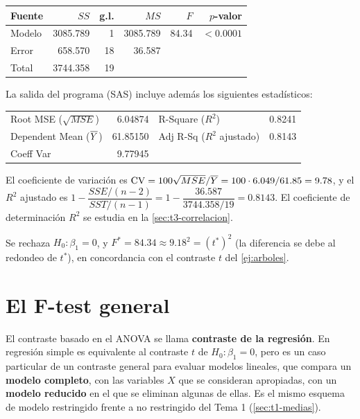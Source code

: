 \begin{ejemplo}
  \begin{center}
    \renewcommand{\arraystretch}{1.2}
    \begin{tabular}{lrrrrr}
      \toprule
      Fuente & $SS$ & g.l. & $MS$ & $F$ & $p$-valor \\
      \midrule
      Modelo & 3085.789 & 1 & 3085.789 & 84.34 & $<0.0001$ \\
      Error & 658.570 & 18 & 36.587 & & \\
      Total & 3744.358 & 19 & & & \\
      \bottomrule
    \end{tabular}
  \end{center}
  La salida del programa (SAS) incluye además los siguientes estadísticos:
  \begin{center}
    \renewcommand{\arraystretch}{1.2}
    \begin{tabular}{lr@{\qquad}lr}
      \toprule
      Root MSE ($\sqrt{MSE}$) & 6.04874 & R-Square ($R^2$) & 0.8241 \\
      Dependent Mean ($\overline{Y}$) & 61.85150 & Adj R-Sq ($R^2$ ajustado) & 0.8143 \\
      Coeff Var & 9.77945 & & \\
      \bottomrule
    \end{tabular}
  \end{center}
  El coeficiente de variación es $\text{CV}=100\sqrt{MSE}/\overline{Y}=100\cdot6.049/61.85=9.78$,
  y el $R^2$ ajustado es $1-\dfrac{SSE/(n-2)}{SST/(n-1)}=1-\dfrac{36.587}{3744.358/19}=0.8143$.
  El coeficiente de determinación $R^2$ se estudia en la \cref{sec:t3-correlacion}.

  Se rechaza $H_0\colon\beta_1=0$, y $F^*=84.34\approx9.18^2=(t^*)^2$ (la diferencia se debe al
  redondeo de $t^*$), en concordancia con el
  contraste $t$ del \cref{ej:arboles}.
\end{ejemplo}

\section{El F-test general}
\label{sec:t3-ftest-general}

El contraste basado en el ANOVA se llama \textbf{contraste de la regresión}. En regresión simple
es equivalente al contraste $t$ de $H_0\colon\beta_1=0$, pero es un caso particular de un
contraste general para evaluar modelos lineales, que compara un \textbf{modelo completo}, con las
variables $X$ que se consideran apropiadas, con un \textbf{modelo reducido} en el que se eliminan
algunas de ellas. Es el mismo esquema de modelo restringido frente a no restringido del Tema 1
(\cref{sec:t1-medias}).

